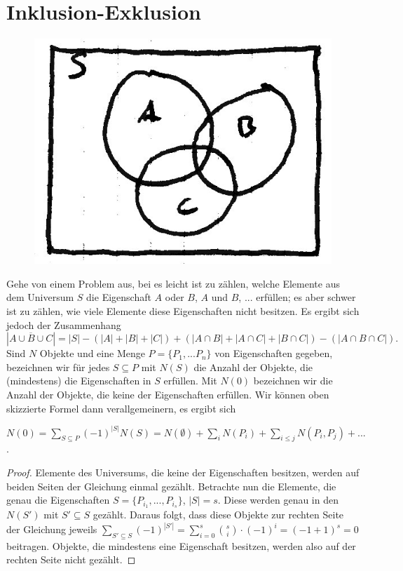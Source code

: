 \chapter{Inklusion-Exklusion}

  \begin{figure}[h]
    \centering
    \includegraphics[width=.25\textwidth]{./Bilder/b03.jpg}
  \end{figure}
  
  Gehe von einem Problem aus, bei es leicht ist zu zählen, welche Elemente aus dem Universum \(S\) die Eigenschaft \(A\) oder \(B\), \(A\) und \(B\), ... erfüllen; es aber schwer ist zu zählen, wie viele Elemente diese Eigenschaften nicht besitzen. Es ergibt sich jedoch der Zusammenhang
  \[
    | \overline{A \cup B \cup C} | = |S| - ( |A| + |B| + |C| ) + ( |A \cap B| + |A \cap C| + |B \cap C| ) - ( | A \cap B \cap C | ).
  \]
  Sind \(N\) Objekte und eine Menge \(P = \{ P_1, ... P_n \}\) von Eigenschaften gegeben, bezeichnen wir für jedes \(S \subseteq P\) mit \(N(S)\) die Anzahl der Objekte, die (mindestens) die Eigenschaften in \(S\) erfüllen. Mit \(N(0)\) bezeichnen wir die Anzahl der Objekte, die keine der Eigenschaften erfüllen. Wir können oben skizzierte Formel dann verallgemeinern, es ergibt sich
  
  \begin{theorem} \label{satzInklSumme}
    \(N(0) = \sum_{S \subseteq P} (-1)^{|S|} N(S) = N(\emptyset) + \sum_i N(P_i) + \sum_{i \leq j} N(P_i, P_j) + ...\).
  \end{theorem}
  
  \begin{proof}
    Elemente des Universums, die keine der Eigenschaften besitzen, werden auf beiden Seiten der Gleichung einmal gezählt. Betrachte nun die Elemente, die genau die Eigenschaften \(S = \{ P_{i_1}, ..., P_{i_s}\}\), \(|S| = s\). Diese werden genau in den \(N(S')\) mit \(S' \subseteq S\) gezählt. Daraus folgt, dass diese Objekte zur rechten Seite der Gleichung jeweils \( \sum_{S' \subseteq S} (-1)^{|S'|} = \sum_{i=0}^s \binom{s}{i} \cdot (-1)^i = (-1 + 1)^s = 0\) beitragen. Objekte, die mindestens eine Eigenschaft besitzen, werden also auf der rechten Seite nicht gezählt.
  \end{proof}
  
